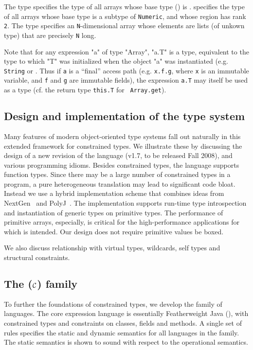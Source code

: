 The type  specifies the type of all arrays
whose base type () is .
 
specifies the type of all arrays whose base
type is a subtype of {\tt Numeric}, and whose region has rank {\tt 2}.
The type 
 
specifies an {\tt N}-dimensional array whose elements are lists (of
unkown type) that are precisely {\tt N} long.

Note that for any expression \xcd"a" of type \xcd"Array", \xcd"a.T" is
a type, equivalent to the type to which \xcd"T" was initialized when
the object \xcd"a" was instantiated (e.g.{} {\tt String} or .  Thus if {\tt a} is a ``final'' access path
(e.g. {\tt x.f.g}, where {\tt x} is an immutable variable, and {\tt f}
and {\tt g} are immutable fields), the expression {\tt a.T} may itself
be used as a type (cf. the return type {\tt this.T} for {\tt
Array.get}).

\subsection{Design and implementation of the \Xten{} type system}
Many features of modern object-oriented type systems fall out
naturally in this extended framework for constrained types.
%
We illustrate these by discussing the design of a new revision of the
\Xten{} language (v1.7, to be released Fall 2008), and various
programming idioms. Besides constrained types, the language supports
function types. Since there may be a large number of constrained types
in a program, a pure heterogeneous translation may lead to significant
code bloat. Instead we use a hybrid implementation scheme that
combines ideas from NextGen~\cite{nextgen,allen03,allen04} and
PolyJ~\cite{java-popl97}. The implementation supports run-time type
introspection and instantiation of generic types on primitive types.
The performance of primitive arrays, especially, is critical for the
high-performance applications for which \Xten{} is intended.  Our
design does not require primitive values be boxed.

We also discuss relationship with virtual types, \Java{} wildcards,
self types and structural constraints.

\subsection{The \FX($\cal C$) family}
To further the foundations of constrained types, we develop the \FX{}
family of languages. The core expression language is essentially
Featherweight Java (\FJ \cite{FJ}), with constrained types and constraints on classes, fields
and methods. A single set of rules specifies the static and dynamic
semantics for all languages in the family.  The static semantics is
shown to sound with respect to the operational semantics.

